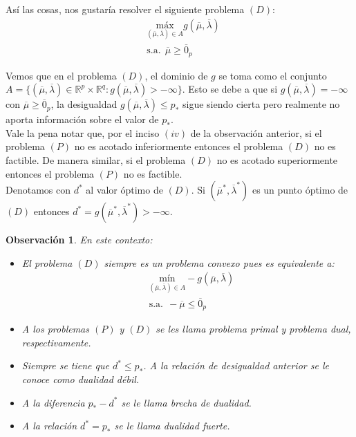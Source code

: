 \documentclass[11pt]{report}
\newtheorem{observation}{Observación}[section]
\newcommand{\Rp}{\mathbb{R}^{p}}
\newcommand{\Rq}{\mathbb{R}^{q}}
\newcommand{\mv}{\overline{\mu}}
\newcommand{\lv}{\overline{\lambda}}
\newcommand{\zp}{\overline{0}_{p}}
\newcommand{\po}{p_{*}}
\newcommand{\deo}{d^{*}}
\newcommand{\muo}{\overline{\mu}^{*}}
\newcommand{\lao}{\overline{\lambda}^{*}}
\newcommand{\mlo}{(\overline{\mu}^{*},\overline{\lambda}^{*})}
\begin{document}
Así las cosas, nos gustaría resolver el siguiente problema $(D)$:
\begin{equation*}
\begin{aligned}
& \underset{(\mv,\lv)\in A}{\text{máx}} g(\mv,\lv) \\
& \text{s.a.}\ \ \mv\geq\zp
\end{aligned}
\end{equation*}

 Vemos que en el problema $(D)$, el dominio de $g$ se toma como el conjunto $A=\{(\mv,\lv)\in\Rp\times\Rq: g(\mv,\lv)>-\infty\}$. Esto se debe a que si $g(\mv,\lv)=-\infty$ con $\mv\geq\zp$, la desigualdad $g(\mv,\lv)\leq\po$ sigue siendo cierta pero realmente no aporta información sobre el valor de $\po$.\\


 Vale la pena notar que, por el inciso $(iv)$ de la observación anterior, si el problema $(P)$ no es acotado inferiormente entonces el problema $(D)$ no es factible. De manera similar, si el problema $(D)$ no es acotado superiormente entonces el problema $(P)$ no es factible.\\


 Denotamos con $\deo$ al valor óptimo de $(D)$. Si $(\muo, \lao)$ es un punto óptimo de $(D)$ entonces $\deo=g\mlo>-\infty$.\\


\begin{observation}
En este contexto:
\begin{itemize}
\item[(i)] El problema $(D)$ siempre es un problema convexo pues es equivalente a:
\begin{equation*}
\begin{aligned}
& \underset{(\mv,\lv)\in A}{\text{mín}} -g(\mv,\lv) \\
& \text{s.a.}\ \ -\mv\leq\zp
\end{aligned}
\end{equation*}
\item[(ii)] A los problemas $(P)$ y $(D)$ se les llama \emph{problema primal} y \emph{problema dual}, respectivamente.
\item[(iii)] Siempre se tiene que $\deo\leq\po$. A la relación de desigualdad anterior se le conoce como \emph{dualidad débil}.
\item[(iv)] A la diferencia $\po - \deo$ se le llama \emph{brecha de dualidad}.
\item[(v)] A la relación $\deo=\po$ se le llama \emph{dualidad fuerte}.

\end{itemize}
\end{observation}
\end{document}
